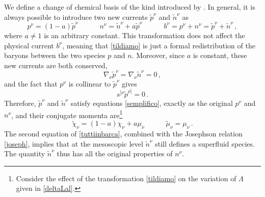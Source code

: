 \documentclass[preprints,article,accept,moreauthors,pdftex]{mdpi}
\newcommand{\spc}{\quad \quad \quad}
\begin{document}
We define a change of chemical basis of the kind introduced by \citet{Carter_Starting_Point}.
In general, it is always possible to introduce two new currents $\tilde{p}^\nu $ and $\tilde{n}^\nu$ as \begin{equation}
\label{tildiamo}
  p^\nu = (1-a)\tilde{p}^\nu  \spc  n^\nu = \tilde{n}^\nu + a \tilde{p}^\nu 
  \spc  b^\nu = p^\nu+n^\nu  = \tilde{p}^\nu + \tilde{n}^\nu 
  \,   ,
\end{equation}
where $a \neq 1$ is an arbitrary constant. This transformation does not affect the physical current $b^\nu$,
meaning that \eqref{tildiamo} is just a formal redistribution of the baryons between the two species $p$ and $n$. Moreover, since $a$ is constant, these new currents are both conserved,
\begin{equation}
\nabla_\nu \tilde{p}^\nu = \nabla_\nu \tilde{n}^\nu =0 \, ,
\end{equation}
and the fact that $p^\nu$ is collinear to $\tilde{p}^\nu$ gives
\begin{equation}
s^{[\nu} \tilde{p}^{\rho]}=0 \, .
\end{equation}
Therefore,  $\tilde{p}^\nu$ and $\tilde{n}^\nu$ satisfy equations \eqref{semplifico}, exactly as the original $p^\nu$ and $n^\nu$, and their conjugate momenta are\footnote{
Consider the effect of the transformation \eqref{tildiamo} on the variation of $\Lambda$ given in  \eqref{deltaLal}.
} 
\begin{equation}
\label{tuttiinbarca}
\tilde{\chi}_\nu = (1-a)\chi_\nu + a \mu_\nu  \spc  \tilde{\mu}_\nu = \mu_\nu
\, .
\end{equation}
The second equation of \eqref{tuttiinbarca}, combined with the Josephson relation \eqref{joseph}, implies that at the mesoscopic level $\tilde{n}^\nu$ still defines a superfluid species. 
The quantity $\tilde{n}^\nu$ thus has all the original properties of $n^\nu$.
\end{document}
